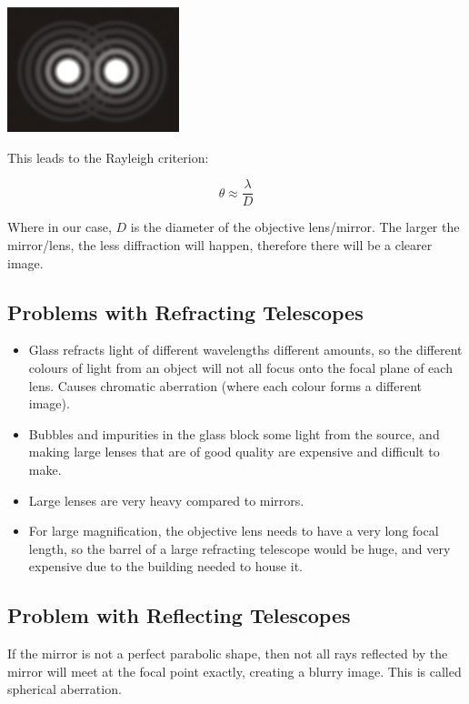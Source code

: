 \documentclass[a4paper, 12pt]{article}
\begin{document}
\begin{center}
\includegraphics[width=5cm]{images/airyDisc.png}
\end{center}

This leads to the Rayleigh criterion:

$$
\theta \approx \frac{\lambda}{D}
$$

Where in our case, $D$ is the diameter of the objective lens/mirror. The larger the mirror/lens, the less diffraction will happen, therefore there will be a clearer image.

\subsection{Problems with Refracting Telescopes}

\begin{itemize}
	\item Glass refracts light of different wavelengths different amounts, so the different colours of light from an object will not all focus onto the focal plane of each lens. Causes chromatic aberration (where each colour forms a different image).

	\item Bubbles and impurities in the glass block some light from the source, and making large lenses that are of good quality are expensive and difficult to make.

	\item Large lenses are very heavy compared to mirrors.

	\item For large magnification, the objective lens needs to have a very long focal length, so the barrel of a large refracting telescope would be huge, and very expensive due to the building needed to house it.
\end{itemize}

\subsection{Problem with Reflecting Telescopes}

If the mirror is not a perfect parabolic shape, then not all rays reflected by the mirror will meet at the focal point exactly, creating a blurry image. This is called spherical aberration.
\end{document}
